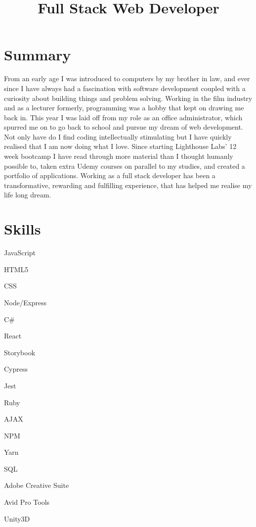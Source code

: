 \documentclass[11pt,a4paper,sans]{moderncv}
\title{Full Stack Web Developer} %
\begin{document}
\makecvtitle
\vspace{-2em}

\section{Summary} %
\label{sec:summary}

From an early age I was introduced to computers by my brother in law, and ever since I have always had a fascination with software development coupled with a curiosity about building things and problem solving. Working in the film industry and as a lecturer formerly, programming was a hobby that kept on drawing me back in. This year I was laid off from my role as an office administrator, which spurred me on to go back to school and pursue my dream of web development. Not only have do I find coding intellectually stimulating but I have quickly realised that I am now doing what I love. Since starting Lighthouse Labs' 12 week bootcamp I have read through more material than I thought humanly possible to, taken extra Udemy courses on parallel to my studies, and created a portfolio of applications. Working as a full stack developer has been a transformative, rewarding and fulfilling experience, that has helped me realise my life long dream.

\section{Skills}
\begin{itemize}
\begin{multicols}{3}
\item JavaScript
\item HTML5
\item CSS
\item Node/Express
\item C\#
\item React
\item Storybook
\item Cypress
\item Jest
\item Ruby
\item AJAX
\item NPM
\item Yarn
\item SQL
\item Adobe Creative Suite
\item Avid Pro Tools
\item Unity3D
\end{multicols}
\end{itemize}
\end{document}

